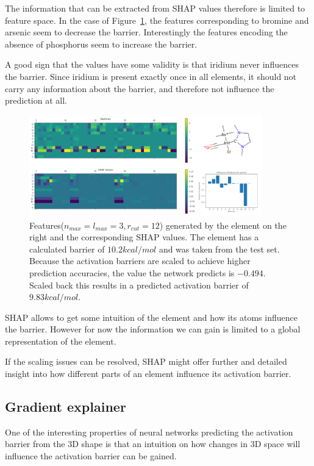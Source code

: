The information that can be extracted from SHAP values therefore is limited to feature space.
In the case of Figure~\ref{fig:shap}, the features corresponding to bromine and arsenic seem to decrease the barrier.
Interestingly the features encoding the absence of phosphorus seem to increase the barrier.

A good sign that the values have some validity is that iridium never influences the barrier.
Since iridium is present exactly once in all elements, it should not carry any information about the barrier,
and therefore not influence the prediction at all.

\begin{figure}[H]
    \centering
    \includegraphics[width=0.9\textwidth]{figures/evaluation/SHAP.png}
    \caption[SHAP values]{
        Features($n_{max}=l_{max}=3, r_{cut}=12$) generated by the element on the right and the corresponding SHAP values.
        The element has a calculated barrier of $10.2 kcal/mol$ and was taken from the test set.
        Because the activation barriers are scaled to achieve higher prediction accuracies,
        the value the network predicts is $-0.494$. Scaled back this results in a predicted activation 
        barrier of $9.83 kcal/mol$.
     }
    \label{fig:shap}
  \end{figure}

SHAP allows to get some intuition of the element and how its atoms influence the barrier.
However for now the information we can gain is limited to a global representation of the element.

If the scaling issues can be resolved, SHAP might offer further and detailed insight into how different parts of an element influence its activation barrier.

\subsection{Gradient explainer}

One of the interesting properties of neural networks predicting the activation barrier from the 3D shape is 
that an intuition on how changes in 3D space will influence the activation barrier can be gained.

